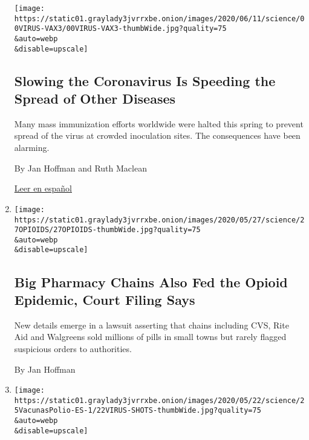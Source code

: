 \begin{enumerate}
  \texttt{[image: https://static01.graylady3jvrrxbe.onion/images/2020/06/11/science/00VIRUS-VAX3/00VIRUS-VAX3-thumbWide.jpg?quality=75\\\&auto=webp\\\&disable=upscale]}

  \hypertarget{slowing-the-coronavirus-is-speeding-the-spread-of-other-diseases}{%
  \subsection{Slowing the Coronavirus Is Speeding the Spread of Other
  Diseases}\label{slowing-the-coronavirus-is-speeding-the-spread-of-other-diseases}}

  Many mass immunization efforts worldwide were halted this spring to
  prevent spread of the virus at crowded inoculation sites. The
  consequences have been alarming.

  By Jan Hoffman and Ruth Maclean

  \href{https://www.nytimes3xbfgragh.onion/es/2020/06/16/espanol/mundo/coronavirus-sarampion.html}{Leer
  en español}
\item
  \href{/2020/05/27/health/opioids-pharmacy-cvs-litigation.html}{}

  \texttt{[image: https://static01.graylady3jvrrxbe.onion/images/2020/05/27/science/27OPIOIDS/27OPIOIDS-thumbWide.jpg?quality=75\\\&auto=webp\\\&disable=upscale]}

  \hypertarget{big-pharmacy-chains-also-fed-the-opioid-epidemic-court-filing-says}{%
  \subsection{Big Pharmacy Chains Also Fed the Opioid Epidemic, Court
  Filing
  Says}\label{big-pharmacy-chains-also-fed-the-opioid-epidemic-court-filing-says}}

  New details emerge in a lawsuit asserting that chains including CVS,
  Rite Aid and Walgreens sold millions of pills in small towns but
  rarely flagged suspicious orders to authorities.

  By Jan Hoffman
\item
  \href{/es/2020/05/25/espanol/ciencia-y-tecnologia/vacuna-polio-sarampion-coronavirus.html}{}

  \texttt{[image: https://static01.graylady3jvrrxbe.onion/images/2020/05/22/science/25VacunasPolio-ES-1/22VIRUS-SHOTS-thumbWide.jpg?quality=75\\\&auto=webp\\\&disable=upscale]}

  \hypertarget{la-polio-y-el-sarampiuxf3n-podruxedan-aumentar-por-la-interrupciuxf3n-de-las-campauxf1as-de-vacunaciuxf3n-en-el-mundo}{%
}
\end{enumerate}
